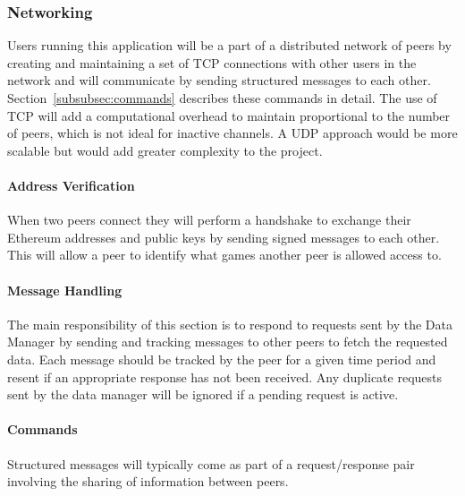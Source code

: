 \subsubsection{Networking}

Users running this application will be a part of a distributed network of peers by creating and maintaining a set of TCP connections with other users in the network and will communicate by sending structured messages to each other. Section~\ref{subsubsec:commands} describes these commands in detail.
\x
The use of TCP will add a computational overhead to maintain proportional to the number of peers, which is not ideal for inactive channels. A UDP approach would be more scalable but would add greater complexity to the project.

\paragraph*{Address Verification}
When two peers connect they will perform a handshake to exchange their Ethereum addresses and public keys by sending signed messages to each other. This will allow a peer to identify what games another peer is allowed access to.

\paragraph*{Message Handling}

The main responsibility of this section is to respond to requests sent by the Data Manager by sending and tracking messages to other peers to fetch the requested data. Each message should be tracked by the peer for a given time period and resent if an appropriate response has not been received. Any duplicate requests sent by the data manager will be ignored if a pending request is active. 

\paragraph*{Commands}\label{subsubsec:commands}

Structured messages  will typically come as part of a request/response pair involving the sharing of information between peers.

